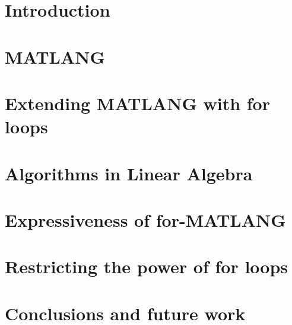 \documentclass[acmsmall,review]{acmart}
\begin{document}
 




\maketitle

\section{Introduction}



\section{MATLANG}\label{sec:matlang}


\section{Extending MATLANG with for loops}\label{sec:formatlang}



%

\section{Algorithms in Linear Algebra}\label{sec:queries}


\section{Expressiveness of for-MATLANG}\label{sec:circuits}



\section{Restricting the power of for loops}\label{sec:restrict}


\section{Conclusions and future work}\label{sec:conclude}

\end{document}
